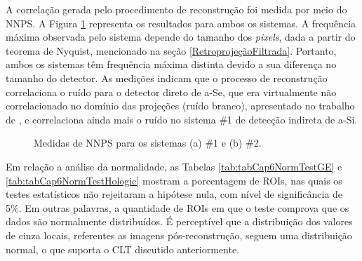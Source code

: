 A correlação gerada pelo procedimento de reconstrução foi medida por meio do \acs{NNPS}. A Figura \ref{fig:imgCap6NNPS} representa os resultados para ambos os sistemas. A frequência máxima observada pelo sistema depende do tamanho dos \textit{pixels}, dada a partir do teorema de Nyquist, mencionado na seção \ref{RetroprojeçãoFiltrada}. Portanto, ambos os sistemas têm frequência máxima distinta devido a sua diferença no tamanho do detector. As medições indicam que o processo de reconstrução correlaciona o ruído para o detector direto de \acs{a-Se}, que era virtualmente não correlacionado no domínio das projeções (ruído branco), apresentado no trabalho de ,  e correlaciona ainda mais o ruído no sistema \#1 de detecção indireta de  \acs{a-Si}.

\begin{figure}[htb]
	\centering
	\caption{Medidas de \acs{NNPS} para os sistemas (a) \#1 e (b) \#2.} 
	\hfill
	\label{fig:imgCap6NNPS}
\end{figure}

Em relação a análise da normalidade, as Tabelas \ref{tab:tabCap6NormTestGE} e \ref{tab:tabCap6NormTestHologic} mostram a porcentagem de \acs{ROI}s, nas quais os testes estatísticos não rejeitaram a hipótese nula, com nível de significância de 5\%. Em outras palavras, a quantidade de \acs{ROI}s em que o teste comprova que os dados são normalmente distribuídos. É perceptível que a distribuição dos valores de cinza locais, referentes as imagens pós-reconstrução, seguem uma distribuição normal, o que suporta o \acs{CLT} discutido anteriormente.

